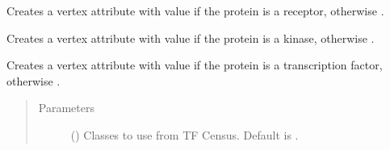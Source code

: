 \documentclass[letterpaper,10pt,english]{sphinxmanual}
\begin{document}
\begin{fulllineitems}

\begin{fulllineitems}
\label{\detokenize{reference:pypath.main.PyPath.set_receptors}}
Creates a vertex attribute  with value  if
the protein is a receptor, otherwise .

\end{fulllineitems}


\begin{fulllineitems}
\label{\detokenize{reference:pypath.main.PyPath.set_signaling_proteins}}
Creates a vertex attribute  with value  if
the protein is a kinase, otherwise .

\end{fulllineitems}


\begin{fulllineitems}
\label{\detokenize{reference:pypath.main.PyPath.set_tfs}}
\end{fulllineitems}


\begin{fulllineitems}
\label{\detokenize{reference:pypath.main.PyPath.set_transcription_factors}}
Creates a vertex attribute  with value  if
the protein is a transcription factor, otherwise .
\begin{quote}\begin{description}
\item[{Parameters}] \leavevmode
{} () \textendash{} Classes to use from TF Census. Default is \sphinxtitleref{{[}‘a’, ‘b’, ‘other’{]}}.


\end{description}
\end{quote}
\end{fulllineitems}
\end{fulllineitems}
\end{document}
